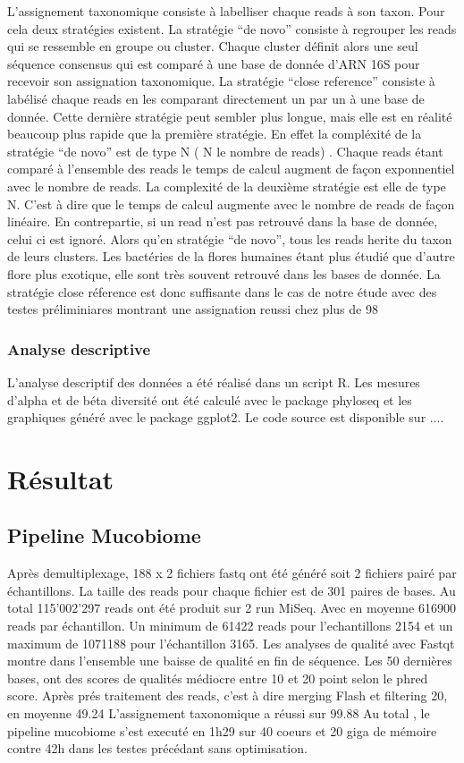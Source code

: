 \documentclass[12pt,a4paper]{article}
\begin{document}
L’assignement taxonomique consiste à labelliser chaque reads à son taxon. Pour cela deux stratégies existent.
La stratégie “de novo” consiste à regrouper les reads qui se ressemble en groupe ou cluster.
Chaque cluster définit alors une seul séquence consensus qui est comparé à une base de donnée d’ARN 16S pour recevoir son assignation taxonomique.
La stratégie “close reference” consiste à labélisé chaque reads en les comparant directement un par un à une base de donnée. Cette dernière stratégie peut sembler plus longue, mais elle est en réalité beaucoup plus rapide que la première stratégie. En effet la compléxité de la stratégie “de novo” est de type N ( N le nombre de reads) . Chaque reads étant comparé à l’ensemble des reads le temps de calcul augment de façon exponnentiel avec le nombre de reads.
La complexité de la deuxième stratégie est elle de type N. C’est à dire que le temps de calcul augmente avec le nombre de reads de façon linéaire. En contrepartie, si un read n’est pas retrouvé dans la base de donnée, celui ci est ignoré. Alors qu’en stratégie “de novo”, tous les reads herite du taxon de leurs clusters.
Les bactéries de la flores humaines étant plus étudié que d’autre flore plus exotique, elle sont très souvent retrouvé dans les bases de donnée. La stratégie close réference est donc suffisante dans le cas de notre étude avec des testes préliminiares montrant une assignation reussi chez plus de 98%

\subsubsection{Analyse descriptive}
L'analyse descriptif des données a été réalisé dans un script R. Les mesures d'alpha et de béta diversité ont été calculé avec le package phyloseq et les graphiques généré avec le package ggplot2. 
Le code source est disponible sur .... 

\section{Résultat}
\subsection{Pipeline Mucobiome}
Après demultiplexage, 188 x 2 fichiers fastq ont été généré soit 2 fichiers pairé par échantillons.
La taille des reads pour chaque fichier est de 301 paires de bases.
Au total 115’002’297 reads ont été produit sur 2 run MiSeq. Avec en moyenne 616900 reads par échantillon. Un minimum de 61422 reads pour l’echantillons 2154 et un maximum de 1071188 pour l’échantillon 3165.
Les analyses de qualité avec Fastqt montre dans l’ensemble une baisse de qualité en fin de séquence. Les 50 dernières bases, ont des scores de qualités médiocre entre 10 et 20 point selon le phred score.
Après prés traitement des reads, c’est à dire merging Flash et filtering 20, en moyenne 49.24 %
L’assignement taxonomique a réussi sur 99.88%
Au total , le pipeline mucobiome s’est executé en 1h29 sur 40 coeurs et 20 giga de mémoire contre 42h dans les testes précédant sans optimisation.
\end{document}
